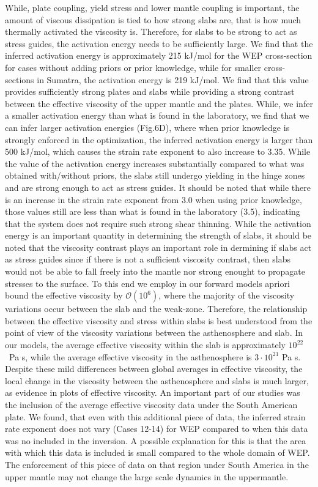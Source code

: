 \documentclass[12pt]{article}
\begin{document}
{   While, plate coupling, yield stress and lower mantle coupling is important, the amount of viscous dissipation is tied to how strong slabs are, that is how much thermally activated the viscosity is. Therefore, for slabs to be strong to act as stress guides, the activation energy needs to be sufficiently large.  We find that the inferred activation energy is approximately 215 kJ/mol for the WEP cross-section for cases without adding priors or prior knowledge, while for smaller cross-sections in Sumatra, the activation energy is 219 kJ/mol. We find that this value provides sufficiently strong plates and slabs while providing a strong contrast between the effective viscosity of the upper mantle and the plates. While, we infer a smaller activation energy than what is found in the laboratory, we find that we can infer larger activation energies (Fig.6D), where when prior knowledge is strongly enforced in the optimization, the inferred activation energy is larger than 500 kJ/mol, which causes the strain rate exponent to also increase to 3.35. While the value of the activation energy increases substantially compared to what was obtained with/without priors, the slabs still undergo yielding in the hinge zones and are strong enough to act as stress guides. It should be noted that while there is an increase in the strain rate exponent from 3.0 when using prior knowledge, those values still are less than what is found in the laboratory (3.5), indicating that the system does not require such strong shear thinning. While the activation energy is an important quantity in determining the strength of slabs, it should be noted that the viscosity contrast plays an important role in dermining if slabs act as stress guides since if there is not a sufficient viscosity contrast, then slabs would not be able to fall freely into the mantle nor strong enought to propagate stresses to the surface. To this end we employ in our forward models apriori bound the effective viscosity by $\mathcal{O}(10^6)$, where the majority of the viscosity variations occur between the slab and the weak-zone. Therefore, the relationship between the effective viscosity and stress within slabs is best understood from the point of view of the viscosity variations between the asthenosphere and slab. In our models, the average effective viscosity within the slab is approximately $10^{22}$ ~Pa s, while the average effective viscosity in the asthenosphere is $3\cdot 10^{21}$ Pa s. 
Despite these mild differences between global averages in effective viscosity, the local change in the viscosity between the asthenosphere and slabs is much larger, as evidence in plots of effective viscosity. An important part of our studies was the inclusion of the average effective viscosity data under the South American plate. We found, that even with this additional piece of data, the inferred strain rate exponent does not vary (Cases  12-14) for WEP compared to when this data was no included in the inversion. A possible explanation for this is that the area with which this data is included is small compared to the whole domain of WEP. The enforcement of this piece of data on that region under South America in the upper mantle may not change the large scale dynamics in the uppermantle. 


}
\end{document}
